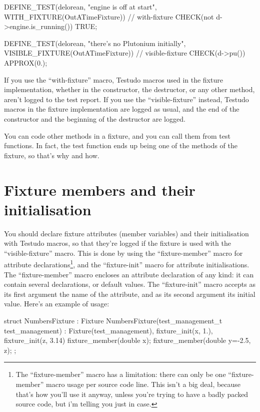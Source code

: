\documentclass[twoside, a4paper, article]{memoir}
\begin{document}
\begin{cpplisting}
DEFINE_TEST(delorean,
            "engine is off at start",
            WITH_FIXTURE(OutATimeFixture)) // with-fixture
{
  CHECK(not d->engine.is_running()) TRUE;
}

DEFINE_TEST(delorean,
            "there's no Plutonium initially",
            VISIBLE_FIXTURE(OutATimeFixture)) // visible-fixture
{
  CHECK(d->pu()) APPROX(0.);
}
\end{cpplisting}

If you use the ``with-fixture'' macro, Testudo macros used in the fixture
implementation, whether in the constructor, the destructor, or any other
method, aren't logged to the test report.  If you use the ``visible-fixture''
instead, Testudo macros in the fixture implementation are logged as usual, and
the end of the constructor and the beginning of the destructor are logged.

You can code other methods in a fixture, and you can call them from test
functions.  In fact, the test function ends up being one of the methods of the
fixture, so that's why and how.

\section{Fixture members and their initialisation}
\label{sec:fixture-members-and-initialisation}

You should declare fixture attributes (member variables) and their
initialisation with Testudo macros, so that they're logged if the fixture is
used with the ``visible-fixture'' macro.  This is done by using the
``fixture-member'' macro for attribute declarations\footnote{The
  ``fixture-member'' macro has a limitation: there can only be one
  ``fixture-member'' macro usage per source code line.  This isn't a big deal,
  because that's how you'll use it anyway, unless you're trying to have a badly
  packed source code, but i'm telling you just in case.}, and the
``fixture-init'' macro for attribute initialisations.  The ``fixture-member''
macro encloses an attribute declaration of any kind: it can contain several
declarations, or default values.  The ``fixture-init'' macro accepts as its
first argument the name of the attribute, and as its second argument its
initial value.  Here's an example of usage:
\begin{cpplisting}
struct NumbersFixture : Fixture {
  NumbersFixture(test_management_t test_management)
    : Fixture(test_management),
      fixture_init(x, 1.), fixture_init(z, 3.14) { }
  fixture_member(double x);
  fixture_member(double y=-2.5, z);
};
\end{cpplisting}
\end{document}
